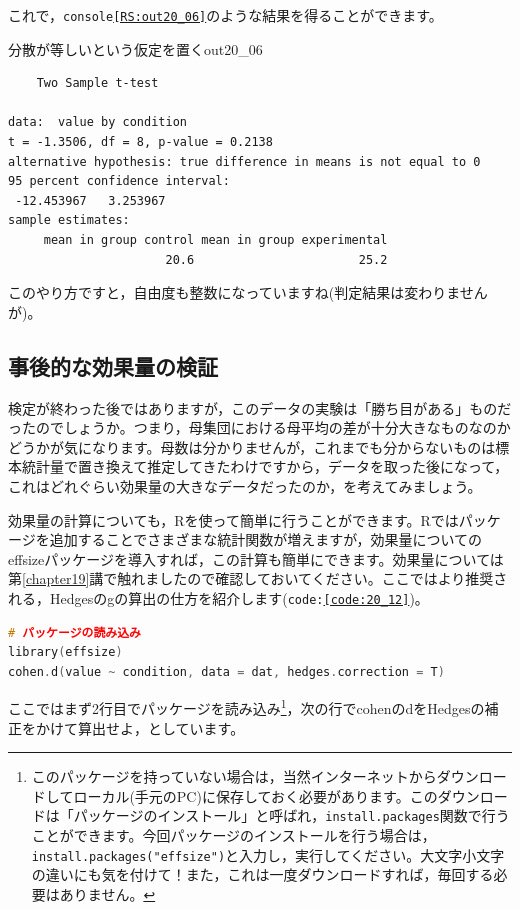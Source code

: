\documentclass{ltjsbook}
\begin{document}
これで，\texttt{console\ref{RS:out20_06}}のような結果を得ることができます。

\begin{Rscreen}{分散が等しいという仮定を置く}{out20_06}
	\begin{verbatim}
	Two Sample t-test

data:  value by condition
t = -1.3506, df = 8, p-value = 0.2138
alternative hypothesis: true difference in means is not equal to 0
95 percent confidence interval:
 -12.453967   3.253967
sample estimates:
     mean in group control mean in group experimental 
                      20.6                       25.2 
\end{verbatim}
\end{Rscreen}
このやり方ですと，自由度も整数になっていますね(判定結果は変わりませんが)。

\subsection{事後的な効果量の検証}
検定が終わった後ではありますが，このデータの実験は「勝ち目がある」ものだったのでしょうか。つまり，母集団における母平均の差が十分大きなものなのかどうかが気になります。母数は分かりませんが，これまでも分からないものは標本統計量で置き換えて推定してきたわけですから，データを取った後になって，これはどれぐらい効果量の大きなデータだったのか，を考えてみましょう。

効果量の計算についても，Rを使って簡単に行うことができます。Rではパッケージを追加することでさまざまな統計関数が増えますが，効果量についての\textsf{effsize}パッケージ\parencite{effsize}を導入すれば，この計算も簡単にできます。効果量については第\ref{chapter19}講で触れましたので確認しておいてください。ここではより推奨される，Hedgesのgの算出の仕方を紹介します(\texttt{code:\ref{code:20_12}})。

\begin{lstlisting}[language=c++,label={code:20_12},caption={効果量を求める}]
# パッケージの読み込み
library(effsize)
cohen.d(value ~ condition, data = dat, hedges.correction = T)
\end{lstlisting}
ここではまず2行目でパッケージを読み込み\footnote{このパッケージを持っていない場合は，当然インターネットからダウンロードしてローカル(手元のPC)に保存しておく必要があります。このダウンロードは「パッケージのインストール」と呼ばれ，\texttt{install.packages}関数で行うことができます。今回パッケージのインストールを行う場合は，\texttt{install.packages("effsize")}と入力し，実行してください。大文字小文字の違いにも気を付けて！また，これは一度ダウンロードすれば，毎回する必要はありません。}，次の行でcohenのdをHedgesの補正をかけて算出せよ，としています。
\end{document}
